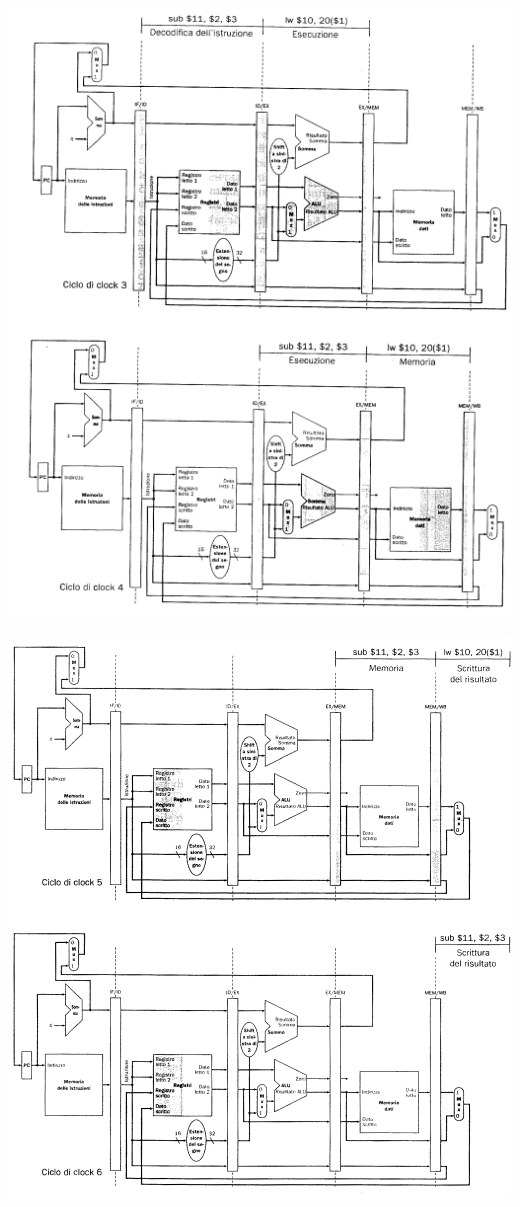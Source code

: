 \documentclass[a4paper,12pt, oneside]{book}
\begin{document}
\begin{center}
  \includegraphics[scale = 0.7]{img/piper4.png}
\end{center}
\begin{center}
  \includegraphics[scale = 0.7]{img/piper5.png}
\end{center}
\end{document}
